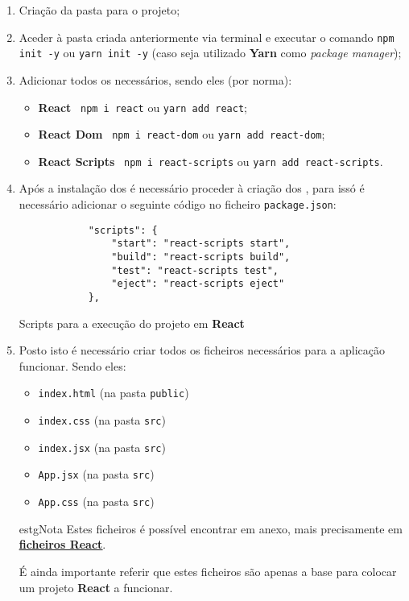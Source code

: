 \begin{enumerate}
	\item Criação da pasta para o projeto;
	\item Aceder à pasta criada anteriormente via terminal e executar o comando \texttt{npm init -y} ou \texttt{yarn init -y} {\scriptsize (caso seja utilizado \textbf{Yarn} como \textit{package manager})};
	\item Adicionar todos os \textit{} necessários, sendo eles {\scriptsize (por norma)}:
	\begin{itemize}
		\item \textbf{React} \textemdash~\texttt{npm i react} ou \texttt{yarn add react};
		\item \textbf{React Dom} \textemdash~\texttt{npm i react-dom} ou \texttt{yarn add react-dom};
		\item \textbf{React Scripts} \textemdash~\texttt{npm i react-scripts} ou \texttt{yarn add react-scripts}.
	\end{itemize}
	\item Após a instalação dos \textit{} é necessário proceder à criação dos \textit{}, para issó é necessário adicionar o seguinte código no ficheiro \texttt{package.json}:

	\begin{longlisting}
		\begin{verbatim}
			"scripts": {
				"start": "react-scripts start",
				"build": "react-scripts build",
				"test": "react-scripts test",
				"eject": "react-scripts eject"
			},
		\end{verbatim}
		\caption{Scripts para a execução do projeto em \textbf{React}}
	\end{longlisting}

	\item Posto isto é necessário criar todos os ficheiros necessários para a aplicação funcionar. Sendo eles:
	\begin{itemize}
		\item \texttt{index.html} {\scriptsize (na pasta \texttt{public})}
		\item \texttt{index.css} {\scriptsize (na pasta \texttt{src})}
		\item \texttt{index.jsx} {\scriptsize (na pasta \texttt{src})}
		\item \texttt{App.jsx} {\scriptsize (na pasta \texttt{src})}
		\item \texttt{App.css} {\scriptsize (na pasta \texttt{src})}
	\end{itemize}

	\vspace{0.25cm}
	\begin{mybox}{estg}{Nota}
		Estes ficheiros é possível encontrar em anexo, mais precisamente em \underline{\textbf{\hyperref[reactFiles]{ficheiros React}}}.

		É ainda importante referir que estes ficheiros são apenas a base para colocar um projeto \textbf{React} a funcionar.
	\end{mybox}
\end{enumerate}

